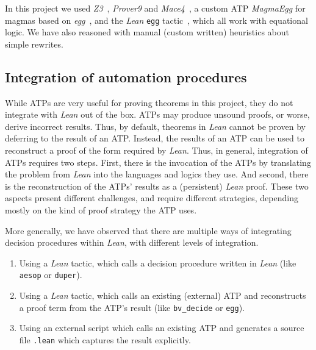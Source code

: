 \documentclass[12pt]{amsart}
\theoremstyle{definition}
\begin{document}
In this project we used \emph{Z3}~\cite{DBLP:conf/tacas/MouraB08}, \emph{Prover9} and \emph{Mace4}~\cite{prover9-mace4}, a custom ATP \emph{MagmaEgg} for magmas based on \emph{egg}~\cite{DBLP:journals/pacmpl/WillseyNWFTP21}, and the \emph{Lean} \texttt{egg} tactic~\cite{DBLP:journals/pacmpl/KoehlerGBGTS24,egg_tactic}, which all work with equational logic. We have also reasoned with manual (custom written) heuristics about simple rewrites.

\subsection{Integration of automation procedures}
\label{sec:proof-reconstruction}

While ATPs are very useful for proving theorems in this project, they do not integrate with \emph{Lean} out of the box.
ATPs may produce unsound proofs, or worse, derive incorrect results.
Thus, by default, theorems in \emph{Lean} cannot be proven by deferring to the result of an ATP\@.
Instead, the results of an ATP can be used to reconstruct a proof of the form required by \emph{Lean}.
Thus, in general, integration of ATPs requires two steps.
First, there is the invocation of the ATPs by translating the problem from \emph{Lean} into the languages and logics they use.
And second, there is the reconstruction of the ATPs' results as a (persistent) \emph{Lean} proof.
These two aspects present different challenges, and require different strategies, depending mostly on the kind of proof strategy the ATP uses.

More generally, we have observed that there are multiple ways of integrating decision procedures within \emph{Lean}, with different levels of integration.

\begin{enumerate}
    \item Using a \emph{Lean} tactic, which calls a decision procedure written in \emph{Lean} (like \texttt{aesop} or \texttt{duper}).
    \item\label{inter} Using a \emph{Lean} tactic, which calls an existing (external) ATP and reconstructs a proof term from the ATP's result (like \texttt{bv\_decide} or \texttt{egg}).
    \item\label{external} Using an external script which calls an existing ATP and generates a source file \texttt{.lean} which captures the result explicitly.
\end{enumerate}
\end{document}
